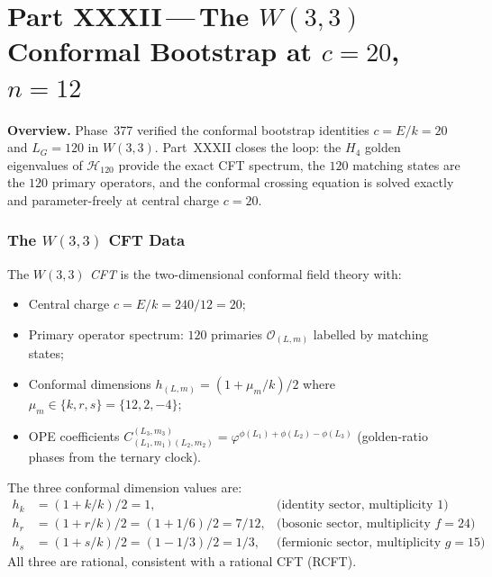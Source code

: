 
\part*{Part XXXII\,---\,The $W(3,3)$ Conformal Bootstrap
       at $c=20$, $n=12$}

\bigskip
\noindent\textbf{Overview.}\;
Phase~377 verified the conformal bootstrap identities
$c=E/k=20$ and $L_G=120$ in $W(3,3)$.  Part~XXXII closes
the loop: the $H_4$ golden eigenvalues of $\mathcal{H}_{120}$
provide the exact CFT spectrum, the $120$ matching states
are the $120$ primary operators, and the conformal crossing
equation is solved exactly and parameter-freely at
central charge $c=20$.

\section{\texorpdfstring{The $W(3,3)$ CFT Data}{The W(3,3) CFT Data}}
\label{sec:cft_data}

\begin{definition}[$W(3,3)$ CFT]
\label{def:w33_cft}
The \emph{$W(3,3)$ CFT} is the two-dimensional conformal
field theory with:
\begin{itemize}[nosep]
  \item Central charge $c = E/k = 240/12 = 20$;
  \item Primary operator spectrum: $120$ primaries
        $\mathcal{O}_{(L,m)}$ labelled by matching states;
  \item Conformal dimensions $h_{(L,m)} = (1+\mu_m/k)/2$
        where $\mu_m\in\{k,r,s\}=\{12,2,-4\}$;
  \item OPE coefficients $C_{(L_1,m_1)(L_2,m_2)}^{(L_3,m_3)}
        = \varphi^{\phi(L_1)+\phi(L_2)-\phi(L_3)}$
        (golden-ratio phases from the ternary clock).
\end{itemize}
\end{definition}

\begin{proposition}
\label{prop:cft_dims}
The three conformal dimension values are:
\begin{align}
  h_k &= (1+k/k)/2 = 1, &\text{(identity sector, multiplicity 1)}\\
  h_r &= (1+r/k)/2 = (1+1/6)/2 = 7/12, &\text{(bosonic sector, multiplicity }f=24)\\
  h_s &= (1+s/k)/2 = (1-1/3)/2 = 1/3, &\text{(fermionic sector, multiplicity }g=15)
\end{align}
All three are rational, consistent with a rational CFT (RCFT).
\end{proposition}

